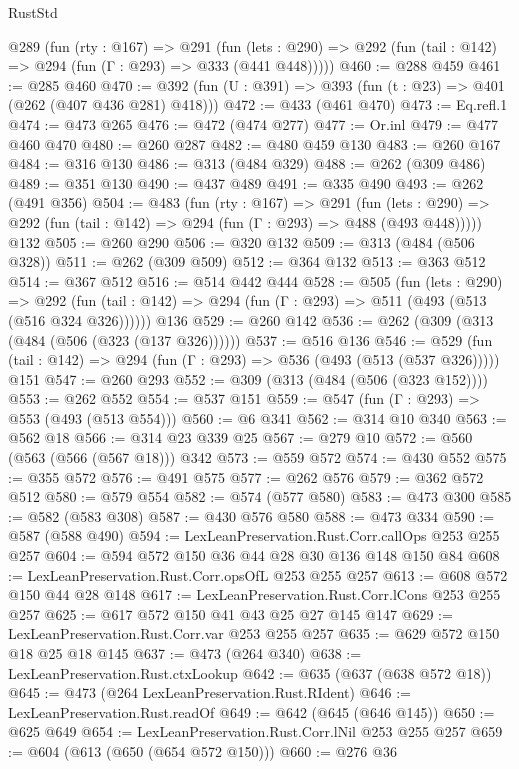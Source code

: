 \begin{lexlean}{RustStd}
\begin{coremodule}
  @289
    (fun (rty : @167) =>
    @291
      (fun (lets : @290) => @292 (fun (tail : @142) => @294 (fun (Γ : @293) => @333 (@441 @448)))))
@460 := @288 @459
@461 := @285 @460
@470 := @392 (fun (U : @391) => @393 (fun (t : @23) => @401 (@262 (@407 @436 @281) @418)))
@472 := @433 (@461 @470)
@473 := Eq.refl.{1}
@474 := @473 @265
@476 := @472 (@474 @277)
@477 := Or.inl
@479 := @477 @460 @470
@480 := @260 @287
@482 := @480 @459 @130
@483 := @260 @167
@484 := @316 @130
@486 := @313 (@484 @329)
@488 := @262 (@309 @486)
@489 := @351 @130
@490 := @437 @489
@491 := @335 @490
@493 := @262 (@491 @356)
@504 := @483
    (fun (rty : @167) =>
    @291
      (fun (lets : @290) => @292 (fun (tail : @142) => @294 (fun (Γ : @293) => @488 (@493 @448)))))
    @132
@505 := @260 @290
@506 := @320 @132
@509 := @313 (@484 (@506 @328))
@511 := @262 (@309 @509)
@512 := @364 @132
@513 := @363 @512
@514 := @367 @512
@516 := @514 @442 @444
@528 := @505
    (fun (lets : @290) =>
    @292 (fun (tail : @142) => @294 (fun (Γ : @293) => @511 (@493 (@513 (@516 @324 @326))))))
    @136
@529 := @260 @142
@536 := @262 (@309 (@313 (@484 (@506 (@323 (@137 @326))))))
@537 := @516 @136
@546 := @529 (fun (tail : @142) => @294 (fun (Γ : @293) => @536 (@493 (@513 (@537 @326))))) @151
@547 := @260 @293
@552 := @309 (@313 (@484 (@506 (@323 @152))))
@553 := @262 @552
@554 := @537 @151
@559 := @547 (fun (Γ : @293) => @553 (@493 (@513 @554)))
@560 := @6 @341
@562 := @314 @10 @340
@563 := @562 @18
@566 := @314 @23 @339 @25
@567 := @279 @10
@572 := @560 (@563 (@566 (@567 @18))) @342
@573 := @559 @572
@574 := @430 @552
@575 := @355 @572
@576 := @491 @575
@577 := @262 @576
@579 := @362 @572 @512
@580 := @579 @554
@582 := @574 (@577 @580)
@583 := @473 @300
@585 := @582 (@583 @308)
@587 := @430 @576 @580
@588 := @473 @334
@590 := @587 (@588 @490)
@594 := LexLeanPreservation.Rust.Corr.callOps @253 @255 @257
@604 := @594 @572 @150 @36 @44 @28 @30 @136 @148 @150 @84
@608 := LexLeanPreservation.Rust.Corr.opsOfL @253 @255 @257
@613 := @608 @572 @150 @44 @28 @148
@617 := LexLeanPreservation.Rust.Corr.lCons @253 @255 @257
@625 := @617 @572 @150 @41 @43 @25 @27 @145 @147
@629 := LexLeanPreservation.Rust.Corr.var @253 @255 @257
@635 := @629 @572 @150 @18 @25 @18 @145
@637 := @473 (@264 @340)
@638 := LexLeanPreservation.Rust.ctxLookup
@642 := @635 (@637 (@638 @572 @18))
@645 := @473 (@264 LexLeanPreservation.Rust.RIdent)
@646 := LexLeanPreservation.Rust.readOf
@649 := @642 (@645 (@646 @145))
@650 := @625 @649
@654 := LexLeanPreservation.Rust.Corr.lNil @253 @255 @257
@659 := @604 (@613 (@650 (@654 @572 @150)))
@660 := @276 @36

\end{coremodule}
\end{lexlean}
